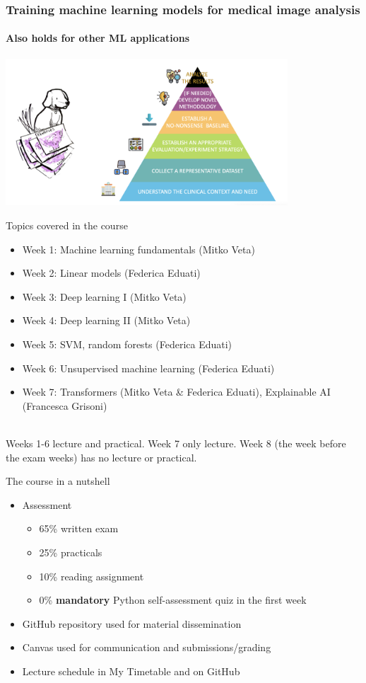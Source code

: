 \documentclass[notes]{beamer}          %
\begin{document}
\begin{frame}
\frametitle{Training machine learning models for medical image analysis}
\framesubtitle{Also holds for other ML applications}
\begin{center}
\includegraphics[height=5.5cm]{../figures/intro/pyramid.png}
\end{center}
\end{frame}


\begin{frame}{Topics covered in the course}
\begin{itemize}
    \item Week 1: Machine learning fundamentals (Mitko Veta)
    \item Week 2: Linear models (Federica Eduati)
    \item Week 3: Deep learning I (Mitko Veta)
    \item Week 4: Deep learning II (Mitko Veta)
    \item Week 5: SVM, random forests (Federica Eduati)
    \item Week 6: Unsupervised machine learning (Federica Eduati) 
    \item Week 7: Transformers (Mitko Veta \& Federica Eduati), Explainable AI (Francesca Grisoni)  
\end{itemize}
$\,$\\
Weeks 1-6 lecture and practical. Week 7 only lecture. Week 8 (the week before the exam weeks) has no lecture or practical. 
\end{frame}

\begin{frame}{The course in a nutshell}
\begin{itemize}
    \item{Assessment}
        \begin{itemize}
            \item 65\% written exam
            \item 25\% practicals
            \item 10\% reading assignment
            \item 0\% \textbf{mandatory} Python self-assessment quiz in the first week
        \end{itemize}
    \item GitHub repository used for material dissemination
    \item Canvas used for communication and submissions/grading
    \item Lecture schedule in My Timetable and on GitHub
    
\end{itemize}
\end{frame}
\end{document}
